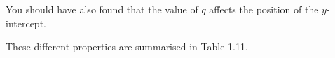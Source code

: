         \label{m39348*id250385}You should have also found that the value of $q$ affects the position of the $y$-intercept.\par 
        \label{m39348*id250408}These different properties are summarised in Table 1.11.\par 
    \setlength\mytablespace{6\tabcolsep}
    \addtolength\mytablespace{4\arrayrulewidth}
    \setlength\mytablewidth{\linewidth}
    \setlength\mytableroom{\mytablewidth}
    \addtolength\mytableroom{-\mytablespace}
    \setlength\myfixedwidth{0pt}
    \setlength\mystarwidth{\mytableroom}
        \addtolength\mystarwidth{-\myfixedwidth}
        \divide{}
